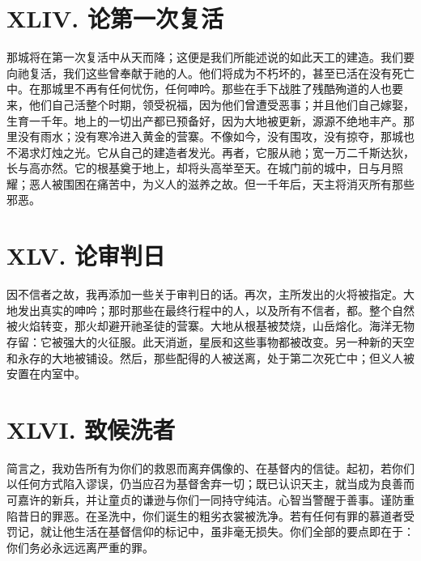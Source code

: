 
\section{XLIV. 论第一次复活}

那城将在第一次复活中从天而降；这便是我们所能述说的如此天工的建造。我们要向祂复活，我们这些曾奉献于祂的人。他们将成为不朽坏的，甚至已活在没有死亡中。在那城里不再有任何忧伤，任何呻吟。那些在手下战胜了残酷殉道的人也要来，他们自己活整个时期，领受祝福，因为他们曾遭受恶事；并且他们自己嫁娶，生育一千年。地上的一切出产都已预备好，因为大地被更新，源源不绝地丰产。那里没有雨水；没有寒冷进入黄金的营寨。不像如今，没有围攻，没有掠夺，那城也不渴求灯烛之光。它从自己的建造者发光。再者，它服从祂；宽一万二千斯达狄，长与高亦然。它的根基奠于地上，却将头高举至天。在城门前的城中，日与月照耀；恶人被围困在痛苦中，为义人的滋养之故。但一千年后，天主将消灭所有那些邪恶。\par


\section{XLV. 论审判日}

因不信者之故，我再添加一些关于审判日的话。再次，主所发出的火将被指定。大地发出真实的呻吟；那时那些在最终行程中的人，以及所有不信者，都。整个自然被火焰转变，那火却避开祂圣徒的营寨。大地从根基被焚烧，山岳熔化。海洋无物存留：它被强大的火征服。此天消逝，星辰和这些事物都被改变。另一种新的天空和永存的大地被铺设。然后，那些配得的人被送离，处于第二次死亡中；但义人被安置在内室中。\par


\section{XLVI. 致候洗者}

简言之，我劝告所有为你们的救恩而离弃偶像的、在基督内的信徒。起初，若你们以任何方式陷入谬误，仍当应召为基督舍弃一切；既已认识天主，就当成为良善而可嘉许的新兵，并让童贞的谦逊与你们一同持守纯洁。心智当警醒于善事。谨防重陷昔日的罪恶。在圣洗中，你们诞生的粗劣衣裳被洗净。若有任何有罪的慕道者受罚记，就让他生活在基督信仰的标记中，虽非毫无损失。你们全部的要点即在于：你们务必永远远离严重的罪。\par

